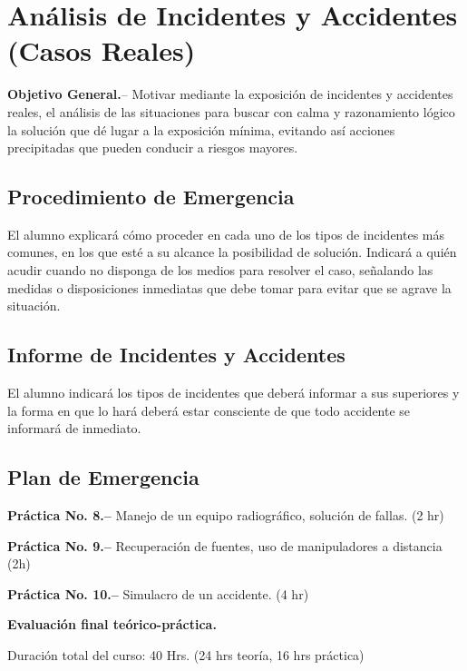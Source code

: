 \section{Análisis de Incidentes y Accidentes (Casos Reales)}

\textbf{Objetivo General.}-- Motivar mediante la exposición de incidentes y accidentes reales, el análisis de las situaciones para buscar con calma y razonamiento lógico la solución que dé lugar a la exposición mínima, evitando así acciones precipitadas que pueden conducir a riesgos mayores.

\subsection{Procedimiento de Emergencia}

El alumno explicará cómo proceder en cada uno de los tipos de incidentes más comunes, en los que esté a su alcance la posibilidad de solución. Indicará a quién acudir cuando no disponga de los medios para resolver el caso, señalando las medidas o disposiciones inmediatas que debe tomar para evitar que se agrave la situación.

\subsection{Informe de Incidentes y Accidentes}

El alumno indicará los tipos de incidentes que deberá informar a sus superiores y la forma en que lo hará deberá estar consciente de que todo accidente se informará de inmediato.

\subsection{Plan de Emergencia}

\textbf{Práctica No. 8.--} Manejo de un equipo radiográfico, solución de fallas. (2 hr)

\textbf{Práctica No. 9.--} Recuperación de fuentes, uso de manipuladores a distancia (2h)

\textbf{Práctica No. 10.--} Simulacro de un accidente. (4 hr)

\textbf{Evaluación final teórico-práctica.}

Duración total del curso: 40 Hrs. (24 hrs teoría, 16 hrs práctica)